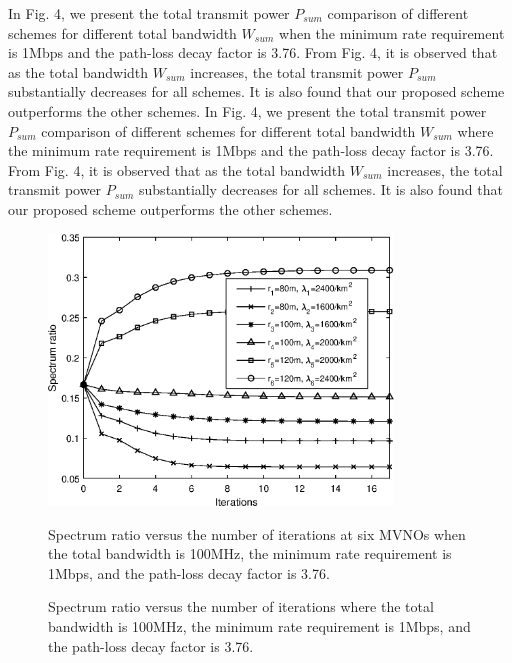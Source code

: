 \documentclass[journal]{IEEEtran}
\begin{document}
\begin{IEEEkeywords}
In Fig. 4, we present the total transmit power $P_{sum}$ comparison of different schemes for different total bandwidth $W_{sum}$ when the minimum rate requirement is 1Mbps and the path-loss decay factor is 3.76. From Fig. 4, it is observed that as the total bandwidth $W_{sum}$ increases, the total transmit power $P_{sum}$ substantially decreases for all schemes. It is also found that our proposed scheme outperforms the other schemes.
In Fig. 4, we present the total transmit power $P_{sum}$ comparison of different schemes for different total bandwidth $W_{sum}$ where the minimum rate requirement is 1Mbps and the path-loss decay factor is 3.76. From Fig. 4, it is observed that as the total bandwidth $W_{sum}$ increases, the total transmit power $P_{sum}$ substantially decreases for all schemes. It is also found that our proposed scheme outperforms the other schemes.

\begin{figure}
	\centering
	\includegraphics[width=3.6in]{SR_convergence.eps}
	\caption{Spectrum ratio versus the number of iterations at six MVNOs when the total bandwidth is 100MHz, the minimum rate requirement is 1Mbps, and the path-loss decay factor is 3.76.}
	\caption{Spectrum ratio versus the number of iterations where the total bandwidth is 100MHz, the minimum rate requirement is 1Mbps, and the path-loss decay factor is 3.76.}
\end{figure}


\end{IEEEkeywords}
\end{document}

